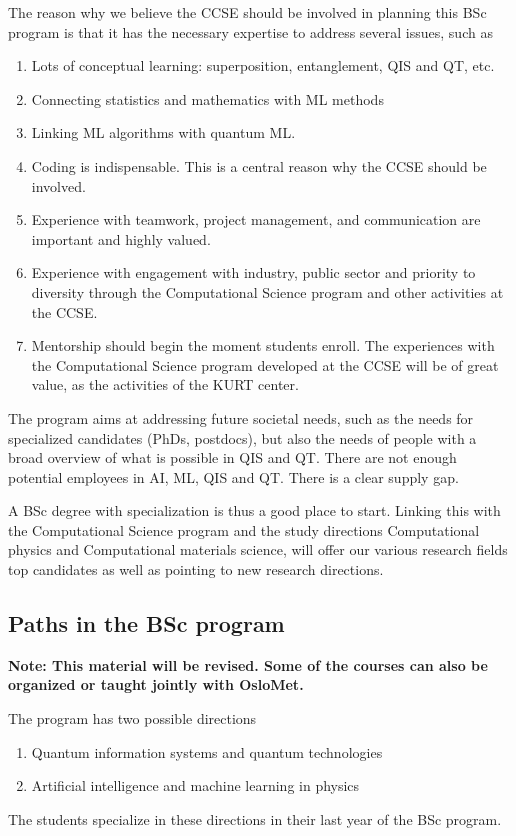 \documentclass[aps,rmp,preprint,amsmath,amssymb,graphicx,longbibliography]{revtex4-1}
\begin{document}
The reason why we believe the CCSE should be involved in planning this BSc program is that it has the necessary expertise to address several issues, such as
\begin{enumerate}
    \item  Lots of conceptual learning: superposition, entanglement, QIS and QT, etc. 
    \item Connecting statistics and mathematics with ML methods
    \item Linking ML algorithms with quantum ML.
\item Coding is indispensable. This is a central reason why the CCSE should be involved.
\item Experience with teamwork, project management, and communication are important and highly valued.
\item  Experience with engagement with industry, public sector and priority to diversity through the Computational Science program and other activities at the CCSE.
\item  Mentorship should begin the moment students enroll. The experiences with the Computational Science program developed at the CCSE will be of great value, as the activities of the KURT center.
\end{enumerate}

The program aims at addressing future societal needs, such as the  needs for specialized candidates (PhDs, postdocs), but also the needs of  people with a broad overview of what is possible in  QIS and QT. There are  not enough potential employees in AI, ML, QIS and QT. There is  a clear supply gap.

A BSc degree  with specialization  is thus a good place to start. Linking this with the Computational Science program and the study directions Computational physics and Computational materials science, will offer our various research fields top candidates as well as pointing to new research directions. 

\subsection{Paths in the BSc program}
{\bf Note: This material will be revised. Some of the courses can also be organized or taught jointly with OsloMet.}


The program has two possible directions
\begin{enumerate}
    \item Quantum information systems and quantum technologies
    \item Artificial intelligence and machine learning in physics
\end{enumerate}
The students specialize in these directions in their last year of the BSc program.
\end{document}
